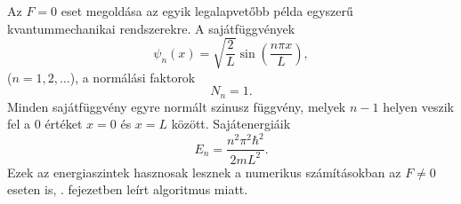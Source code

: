 Az $F=0$ eset megoldása az egyik legalapvetőbb példa egyszerű kvantummechanikai rendszerekre. A sajátfüggvények
\begin{equation}
	\psi_n(x) = \sqrt{\frac{2}{L}}\sin\left(\frac{n\pi x}{L}\right),
\end{equation}
($n=1,2,\dots$), a normálási faktorok
\begin{equation}
	N_n = 1.
\end{equation}
Minden sajátfüggvény egyre normált szinusz függvény, melyek $n-1$ helyen veszik fel a $0$ értéket $x=0$ és $x=L$ között. Sajátenergiáik
\begin{equation}
	E_n = \frac{n^2\pi^2\hbar^2}{2mL^2}.
\end{equation}
Ezek az energiaszintek hasznosak lesznek a numerikus számításokban az $F\neq 0$ eseten is, . fejezetben leírt algoritmus miatt.